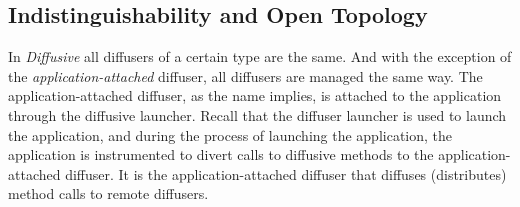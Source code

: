 \documentclass[11pt]{article}
\begin{document}

\subsection{Indistinguishability and Open Topology\label{sec:indistinguishability_and_open_topology}}
In \emph{Diffusive} all diffusers of a certain type are the same. And with the exception of the \emph{application-attached} diffuser, all diffusers are managed the same way. The application-attached diffuser, as the name implies, is attached to the application through the diffusive launcher. Recall that the diffuser launcher is used to launch the application, and during the process of launching the application, the application is instrumented to divert calls to diffusive methods to the application-attached diffuser. It is the application-attached diffuser that diffuses (distributes) method calls to remote diffusers.
\end{document}
